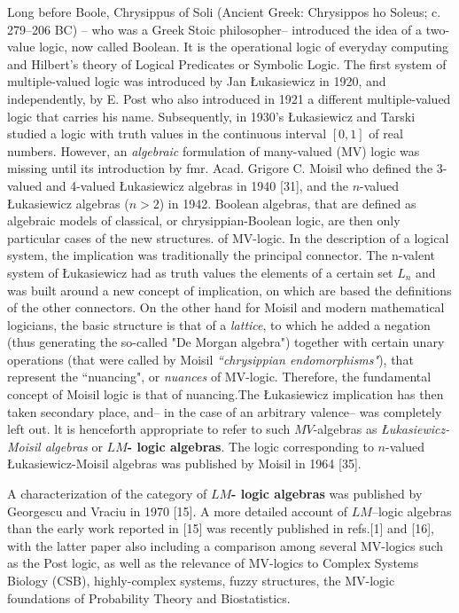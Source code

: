\documentclass[12pt]{article}
\theoremstyle{plain}
\theoremstyle{definition}
\numberwithin{equation}{section}
\begin{document}
Long before Boole, Chrysippus of Soli  (Ancient Greek: Chrysippos ho Soleus; c. 279--206 BC) -- who  was a Greek Stoic philosopher-- introduced the idea of a  two-value logic, now called Boolean. It is the operational logic of everyday computing and Hilbert's theory of Logical Predicates or Symbolic Logic.
The first system of multiple-valued logic was introduced by Jan  \L{}ukasiewicz in 1920, and  independently, by  E. Post who also introduced in 1921 a different multiple-valued logic that carries his name. Subsequently, in 1930's  \L{}ukasiewicz and Tarski studied a logic with truth values in the continuous interval $[0,1]$ of real numbers. However, an \emph{algebraic} formulation of many-valued (MV)  logic was missing until its introduction by fmr. Acad. Grigore C.  Moisil who defined the 3-valued and  4-valued  \L{}ukasiewicz algebras in 1940 [31], and the $n$-valued
 \L{}ukasiewicz algebras ($n>2$) in 1942. Boolean algebras, that are defined as algebraic models of classical, or chrysippian-Boolean logic, are then only particular cases of the new structures. of MV-logic. In the description of a logical system, the implication was traditionally the principal connector. The n-valent system of  \L{}ukasiewicz had as truth values the elements of a certain set  $L_n$ and was built around a new concept of implication, on which are based the definitions of the other connectors. On the other hand for Moisil and modern mathematical logicians, the basic structure is that of a \emph{lattice}, to which he added a negation (thus generating the so-called "De Morgan algebra") together with certain unary operations (that were called by Moisil {\em ``chrysippian endomorphisms"}), that  represent the ``nuancing", or \emph{nuances} of MV-logic.  Therefore, the fundamental concept of Moisil logic is that of nuancing.The \L{}ukasiewicz implication has then taken secondary place, and-- in the case of an arbitrary valence-- was completely left out.  lt is  henceforth appropriate to refer to such $MV$-algebras as \emph{\L{}ukasiewicz-Moisil algebras} or \textbf{$LM$- logic algebras}.  The logic corresponding to $n$-valued \L{}ukasiewicz-Moisil algebras was published by Moisil in 1964 [35].

A characterization of the category of \textbf{$LM$- logic algebras} was published by Georgescu and Vraciu in 1970 [15].  A more detailed account of $LM$--logic algebras than the early work reported in [15] was recently published in refs.[1] and [16], with the latter paper also including a comparison among several MV-logics such as the Post logic, as well as the relevance of MV-logics to Complex Systems Biology (CSB), highly-complex systems, fuzzy structures, the MV-logic foundations of Probability Theory and Biostatistics.   
\end{document}
